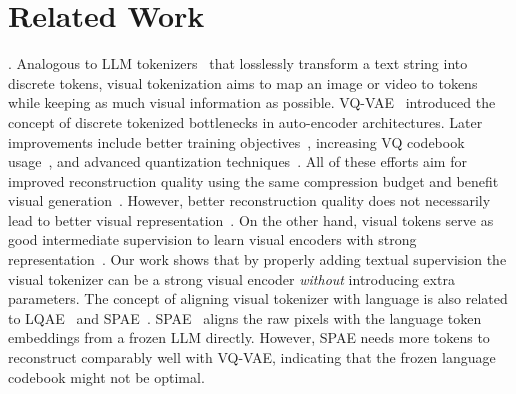 \section{Related Work}
\label{sec:related}

.
Analogous to LLM tokenizers~\cite{sennrich2016bpe,schuster2012wordpiece,kudo2018sentencepiece} that losslessly transform a text string into discrete tokens, visual tokenization aims to map an image or video to tokens while keeping as much visual information as possible.
VQ-VAE~\cite{van2017vqvae} introduced the concept of discrete tokenized bottlenecks in auto-encoder architectures.
Later improvements include better training objectives~\cite{esser2021vqgan,ramesh2021dalle}, increasing VQ codebook usage~\cite{yu2022vitvqgan,zheng2023cvq}, and advanced quantization techniques~\cite{lee2022rqvae,mentzer2023fsq,yu2024magvit2,zhao2024bsq}.
All of these efforts aim for improved reconstruction quality using the same compression budget and benefit visual generation~\cite{chang2022maskgit,yu2024magvit2,tian2024var}.
However, better reconstruction quality does not necessarily lead
to better visual representation~\cite{he2022mae,wei2023diffmae}.
On the other hand, visual tokens serve as good intermediate supervision to learn visual encoders with strong representation~\cite{bao2022beit,peng2022beitv2,zhou2022ibot,li2023mage}.
Our work shows that by properly adding textual supervision the visual tokenizer can be a strong visual encoder \emph{without} introducing extra parameters. 
The concept of aligning visual tokenizer with language is also related to LQAE~\cite{liu2023lqae} and SPAE~\cite{yu2023spae}.
SPAE~\cite{yu2023spae} aligns the raw pixels with the language token embeddings from a frozen LLM directly.
However, SPAE needs more tokens to reconstruct comparably well with VQ-VAE, indicating that the frozen language codebook might not be optimal.

